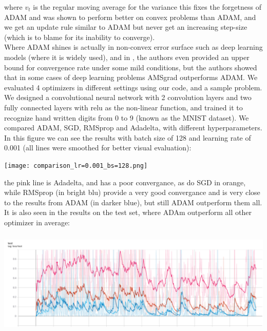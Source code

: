 \documentclass[10pt,a4paper]{article}
\begin{document}
where $v_t$ is the regular moving average for the variance
this fixes the forgetness of ADAM and was shown to perform better on convex problems than ADAM, and we get an update rule similar to ADAM but never get an increasing step-size (which is to blame for its inability to converge).\\
Where ADAM shines is actually in non-convex error surface such as deep learning models (where it is widely used), and in \cite{chen2018convergence}, the authors even provided an upper bound for convergence rate under some mild conditions, but the authors showed that in some cases of deep learning problems AMSgrad outperforms ADAM.
We evaluated 4 optimizers in different settings using our code, and a sample problem. We designed a convolutional neural network with 2 convolution layers and two fully connected layers with relu as the non-linear function, and trained it to recognize hand written digits from 0 to 9 (known as the MNIST dataset). We compared ADAM, SGD, RMSprop and Adadelta, with different hyperparameters.\\
In this figure we can see the results with batch size of 128 and learning rate of 0.001 (all lines were smoothed for better visual evaluation):\\
\begin{center}
    \texttt{[image: comparison\_lr=0.001\_bs=128.png]}
\end{center}
the pink line is Adadelta, and has a poor convergance, as do SGD in orange, while RMSprop (in bright blu) provide a very good convergance and is very close to the results from ADAM (in darker blue), but still ADAM outperform them all.\\
It is also seen in the results on the test set, where ADAm outperform all other optimizer in average:
\begin{center}
    \includegraphics[width=15cm, height=5cm]{test_lr=0.001_batch size=128.png}
\end{center}
\end{document}
